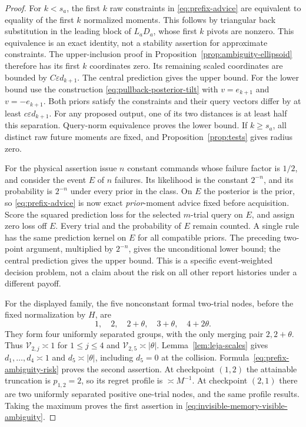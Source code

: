 \begin{proof}
For $k<s_a$, the first $k$ raw constraints in
\eqref{eq:prefix-advice} are equivalent to equality of the first $k$
normalized moments. This follows by triangular back substitution in
the leading block of $L_aD_a$, whose first $k$ pivots are nonzero.
This equivalence is an exact identity, not a stability assertion for
approximate constraints. The upper-inclusion proof in
Proposition~\ref{prop:ambiguity-ellipsoid} therefore has its first $k$
coordinates zero. Its remaining scaled coordinates are bounded by
$C\varepsilon d_{k+1}$. The central prediction gives the upper bound.
For the lower bound use the construction
\eqref{eq:pullback-posterior-tilt} with $v=e_{k+1}$ and $v=-e_{k+1}$.
Both priors satisfy the constraints and their query vectors differ by
at least $c\varepsilon d_{k+1}$. For any proposed output, one of its
two distances is at least half this separation. Query-norm equivalence
proves the lower bound. If $k\ge s_a$, all distinct raw future moments
are fixed, and Proposition~\ref{prop:tests} gives radius zero.

For the physical assertion issue $n$ constant commands whose failure
factor is $1/2$, and consider the event $E$ of $n$ failures. Its
likelihood is the constant $2^{-n}$, and its probability is $2^{-n}$
under every prior in the class. On $E$ the posterior is the prior, so
\eqref{eq:prefix-advice} is now exact \emph{prior}-moment advice fixed
before acquisition. Score the squared prediction loss for the selected
$m$-trial query on $E$, and assign zero loss off $E$. Every trial and
the probability of $E$ remain counted. A single rule has the same
prediction kernel on $E$ for all compatible priors. The preceding
two-point argument, multiplied by $2^{-n}$, gives the unconditional
lower bound; the central prediction gives the upper bound. This is a
specific event-weighted decision problem, not a claim about the risk
on all other report histories under a different payoff.

For the displayed family, the five nonconstant formal two-trial nodes,
before the fixed normalization by $H$, are
\[
 1,\quad 2,\quad 2+\theta,\quad 3+\theta,\quad4+2\theta.
\]
They form four uniformly separated groups, with the only merging pair
$2,2+\theta$. Thus $\mathcal V_{2,j}\asymp1$ for $1\le j\le4$ and
$\mathcal V_{2,5}\asymp|\theta|$. Lemma~\ref{lem:leja-scales}
gives $d_1,\ldots,d_4\asymp1$ and $d_5\asymp|\theta|$,
including $d_5=0$ at the collision. Formula~\eqref{eq:prefix-ambiguity-risk}
proves the second assertion. At checkpoint $(1,2)$ the attainable
truncation is $p_{1,2}=2$, so its regret profile is $\asymp M^{-1}$.
At checkpoint $(2,1)$ there are two uniformly separated positive
one-trial nodes, and the same profile results. Taking the maximum proves
the first assertion in \eqref{eq:invisible-memory-visible-ambiguity}.
\end{proof}

